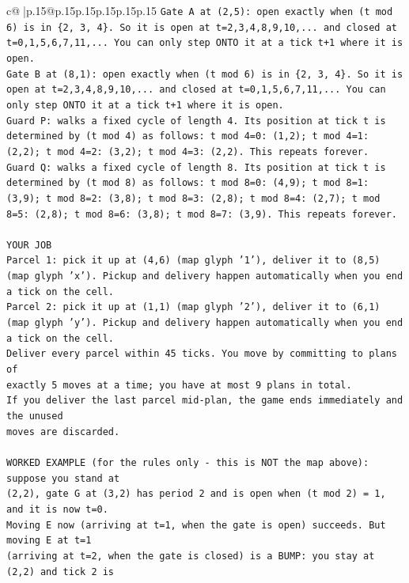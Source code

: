 \documentclass{article}
\begin{document}
{\begin{supertabular}{c@{$\;$}|p{.15\linewidth}@{}p{.15\linewidth}p{.15\linewidth}p{.15\linewidth}p{.15\linewidth}p{.15\linewidth}}
{{{\texttt{Gate A at (2,5): open exactly when (t mod 6) is in \{2, 3, 4\}. So it is open at t=2,3,4,8,9,10,... and closed at t=0,1,5,6,7,11,... You can only step ONTO it at a tick t+1 where it is open.} \\
\texttt{Gate B at (8,1): open exactly when (t mod 6) is in \{2, 3, 4\}. So it is open at t=2,3,4,8,9,10,... and closed at t=0,1,5,6,7,11,... You can only step ONTO it at a tick t+1 where it is open.} \\
\texttt{Guard P: walks a fixed cycle of length 4. Its position at tick t is determined by (t mod 4) as follows: t mod 4=0: (1,2); t mod 4=1: (2,2); t mod 4=2: (3,2); t mod 4=3: (2,2). This repeats forever.} \\
\texttt{Guard Q: walks a fixed cycle of length 8. Its position at tick t is determined by (t mod 8) as follows: t mod 8=0: (4,9); t mod 8=1: (3,9); t mod 8=2: (3,8); t mod 8=3: (2,8); t mod 8=4: (2,7); t mod 8=5: (2,8); t mod 8=6: (3,8); t mod 8=7: (3,9). This repeats forever.} \\
\\ 
\texttt{YOUR JOB} \\
\texttt{Parcel 1: pick it up at (4,6) (map glyph '1'), deliver it to (8,5) (map glyph 'x'). Pickup and delivery happen automatically when you end a tick on the cell.} \\
\texttt{Parcel 2: pick it up at (1,1) (map glyph '2'), deliver it to (6,1) (map glyph 'y'). Pickup and delivery happen automatically when you end a tick on the cell.} \\
\texttt{Deliver every parcel within 45 ticks. You move by committing to plans of} \\
\texttt{exactly 5 moves at a time; you have at most 9 plans in total.} \\
\texttt{If you deliver the last parcel mid{-}plan, the game ends immediately and the unused} \\
\texttt{moves are discarded.} \\
\\ 
\texttt{WORKED EXAMPLE (for the rules only {-} this is NOT the map above): suppose you stand at} \\
\texttt{(2,2), gate G at (3,2) has period 2 and is open when (t mod 2) = 1, and it is now t=0.} \\
\texttt{Moving E now (arriving at t=1, when the gate is open) succeeds. But moving E at t=1} \\
\texttt{(arriving at t=2, when the gate is closed) is a BUMP: you stay at (2,2) and tick 2 is} \\
}}}
\end{supertabular}}
\end{document}
